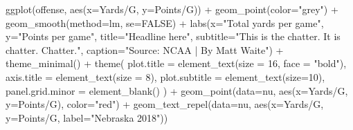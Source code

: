 \documentclass[
  letterpaper,
  DIV=11,
  numbers=noendperiod]{scrreprt}
\newenvironment{Shaded}{\begin{snugshade}}{\end{snugshade}}
\newcommand{\AttributeTok}[1]{\textcolor[rgb]{0.40,0.45,0.13}{#1}}
\newcommand{\ConstantTok}[1]{\textcolor[rgb]{0.56,0.35,0.01}{#1}}
\newcommand{\DecValTok}[1]{\textcolor[rgb]{0.68,0.00,0.00}{#1}}
\newcommand{\FunctionTok}[1]{\textcolor[rgb]{0.28,0.35,0.67}{#1}}
\newcommand{\NormalTok}[1]{\textcolor[rgb]{0.00,0.23,0.31}{#1}}
\newcommand{\SpecialCharTok}[1]{\textcolor[rgb]{0.37,0.37,0.37}{#1}}
\newcommand{\StringTok}[1]{\textcolor[rgb]{0.13,0.47,0.30}{#1}}
\begin{document}
\begin{Shaded}
\begin{Highlighting}[]
\FunctionTok{ggplot}\NormalTok{(offense, }\FunctionTok{aes}\NormalTok{(}\AttributeTok{x=}\StringTok{\textasciigrave{}}\AttributeTok{Yards/G}\StringTok{\textasciigrave{}}\NormalTok{, }\AttributeTok{y=}\StringTok{\textasciigrave{}}\AttributeTok{Points/G}\StringTok{\textasciigrave{}}\NormalTok{)) }\SpecialCharTok{+} 
  \FunctionTok{geom\_point}\NormalTok{(}\AttributeTok{color=}\StringTok{"grey"}\NormalTok{) }\SpecialCharTok{+} \FunctionTok{geom\_smooth}\NormalTok{(}\AttributeTok{method=}\NormalTok{lm, }\AttributeTok{se=}\ConstantTok{FALSE}\NormalTok{) }\SpecialCharTok{+} 
  \FunctionTok{labs}\NormalTok{(}\AttributeTok{x=}\StringTok{"Total yards per game"}\NormalTok{, }\AttributeTok{y=}\StringTok{"Points per game"}\NormalTok{, }\AttributeTok{title=}\StringTok{"Headline here"}\NormalTok{, }\AttributeTok{subtitle=}\StringTok{"This is the chatter. It is chatter. Chatter."}\NormalTok{, }\AttributeTok{caption=}\StringTok{"Source: NCAA | By Matt Waite"}\NormalTok{) }\SpecialCharTok{+} 
  \FunctionTok{theme\_minimal}\NormalTok{() }\SpecialCharTok{+} 
  \FunctionTok{theme}\NormalTok{(}
    \AttributeTok{plot.title =} \FunctionTok{element\_text}\NormalTok{(}\AttributeTok{size =} \DecValTok{16}\NormalTok{, }\AttributeTok{face =} \StringTok{"bold"}\NormalTok{),}
    \AttributeTok{axis.title =} \FunctionTok{element\_text}\NormalTok{(}\AttributeTok{size =} \DecValTok{8}\NormalTok{), }
    \AttributeTok{plot.subtitle =} \FunctionTok{element\_text}\NormalTok{(}\AttributeTok{size=}\DecValTok{10}\NormalTok{), }
    \AttributeTok{panel.grid.minor =} \FunctionTok{element\_blank}\NormalTok{()}
\NormalTok{    ) }\SpecialCharTok{+}
  \FunctionTok{geom\_point}\NormalTok{(}\AttributeTok{data=}\NormalTok{nu, }\FunctionTok{aes}\NormalTok{(}\AttributeTok{x=}\StringTok{\textasciigrave{}}\AttributeTok{Yards/G}\StringTok{\textasciigrave{}}\NormalTok{, }\AttributeTok{y=}\StringTok{\textasciigrave{}}\AttributeTok{Points/G}\StringTok{\textasciigrave{}}\NormalTok{), }\AttributeTok{color=}\StringTok{"red"}\NormalTok{) }\SpecialCharTok{+} 
  \FunctionTok{geom\_text\_repel}\NormalTok{(}\AttributeTok{data=}\NormalTok{nu, }\FunctionTok{aes}\NormalTok{(}\AttributeTok{x=}\StringTok{\textasciigrave{}}\AttributeTok{Yards/G}\StringTok{\textasciigrave{}}\NormalTok{, }\AttributeTok{y=}\StringTok{\textasciigrave{}}\AttributeTok{Points/G}\StringTok{\textasciigrave{}}\NormalTok{, }\AttributeTok{label=}\StringTok{"Nebraska 2018"}\NormalTok{))}
\end{Highlighting}
\end{Shaded}
\end{document}
